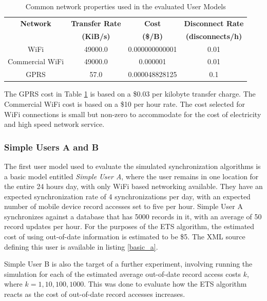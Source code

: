 \begin{table}[htdp]
\begin{center}
\begin{tabular}{|c|c|c|c|}
\hline
\textbf{Network} & \textbf{Transfer Rate} & \textbf{Cost} & \textbf{Disconnect Rate} \\
 & \textbf{(KiB/s)} & \textbf{(\$/B)} & \textbf{(disconnects/h)} \\
\hline
WiFi & 49000.0 & 0.000000000001 & 0.01 \\
\hline
Commercial WiFi & 49000.0 & 0.000001 & 0.01 \\
\hline
GPRS & 57.0 & 0.000048828125 & 0.1 \\
\hline
\end{tabular}
\end{center}
\caption{Common network properties used in the evaluated User Models}
\label{common_networks}
\end{table}

The GPRS cost in Table \ref{common_networks} is based on a \$0.03 per kilobyte transfer charge.  The Commercial WiFi cost is based on a \$10 per hour rate.  The cost selected for WiFi connections is small but non-zero to accommodate for the cost of electricity and high speed network service.

\subsubsection{Simple Users A and B}

The first user model used to evaluate the simulated synchronization algorithms is a basic model entitled \emph{Simple User A}, where the user remains in one location for the entire 24 hours day, with only WiFi based networking available.  They have an expected synchronization rate of 4 synchronizations per day, with an expected number of mobile device record accesses set to five per hour.  Simple User A synchronizes against a database that has 5000 records in it, with an average of 50 record updates per hour.  For the purposes of the ETS algorithm, the estimated cost of using out-of-date information is estimated to be \$5.  The XML source defining this user is available in listing \ref{basic_a}.

Simple User B is also the target of a further experiment, involving running the simulation for each of the estimated average out-of-date record access costs $k$, where $k = {1, 10, 100, 1000}$.  This was done to evaluate how the ETS algorithm reacts as the cost of out-of-date record accesses increases.

